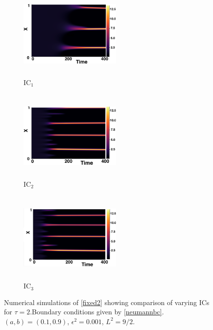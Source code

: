 \begin{figure}[H]
    \centering
    \begin{subfigure}[b]{0.32\textwidth}
        \centering
        \includegraphics[width=5cm,height=4.5cm]{gaff2.png}
        \caption{$\text{IC}_1$}
        \label{}
    \end{subfigure}
    \hfill
    \begin{subfigure}[b]{0.32\textwidth}
        \centering
        \includegraphics[width=5cm,height=4.5cm]{ic22.png}
        \caption{$\text{IC}_2$}
        \label{}
    \end{subfigure}
    \hfill
    \begin{subfigure}[b]{0.32\textwidth}
        \centering
        \includegraphics[width=5cm,height=4.5cm]{ic32.png}
        \caption{$\text{IC}_3$}
        \label{}
    \end{subfigure}
    \caption{Numerical simulations of \eqref{fixed2} showing comparison of varying ICs for $\tau=2$.Boundary conditions given by \eqref{neumannbc}. $(a,b)=(0.1,0.9)$, $\epsilon^2=0.001$, $L^2=9/2$.}
    \label{fig:figtau2}
\end{figure}

